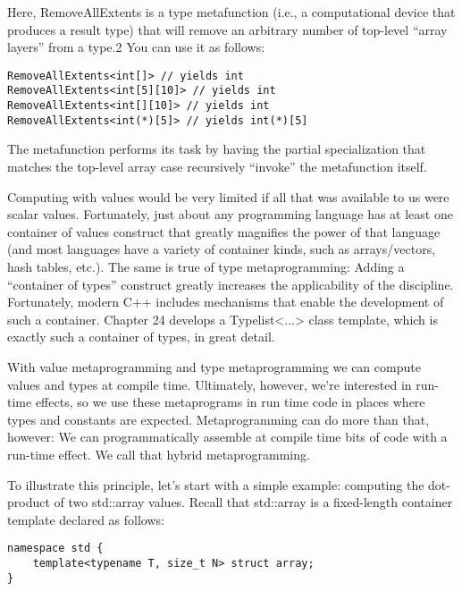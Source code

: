 Here, RemoveAllExtents is a type metafunction (i.e., a computational device that produces a result type) that will remove an arbitrary number of top-level “array layers” from a type.2 You can use it as follows:

\begin{lstlisting}[style=styleCXX]
RemoveAllExtents<int[]> // yields int
RemoveAllExtents<int[5][10]> // yields int
RemoveAllExtents<int[][10]> // yields int
RemoveAllExtents<int(*)[5]> // yields int(*)[5]
\end{lstlisting}

The metafunction performs its task by having the partial specialization that matches the top-level array case recursively “invoke” the metafunction itself.

Computing with values would be very limited if all that was available to us were scalar values. Fortunately, just about any programming language has at least one container of values construct that greatly magnifies the power of that language (and most languages have a variety of container kinds, such as arrays/vectors, hash tables, etc.). The same is true of type metaprogramming: Adding a “container of types” construct greatly increases the applicability of the discipline. Fortunately, modern C++ includes mechanisms that enable the development of such a container. Chapter 24 develops a Typelist<...> class template, which is exactly such a container of types, in great detail.


With value metaprogramming and type metaprogramming we can compute values and types at compile time. Ultimately, however, we’re interested in run-time effects, so we use these metaprograms in run time code in places where types and constants are expected. Metaprogramming can do more than that, however: We can programmatically assemble at compile time bits of code with a run-time effect. We call that hybrid metaprogramming.

To illustrate this principle, let’s start with a simple example: computing the dot-product of two std::array values. Recall that std::array is a fixed-length container template declared as follows:

\begin{lstlisting}[style=styleCXX]
namespace std {
	template<typename T, size_t N> struct array;
}
\end{lstlisting}

